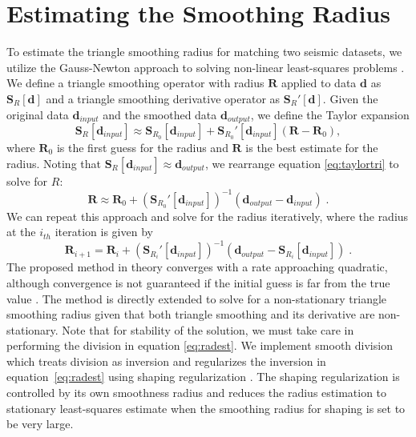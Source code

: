\section{Estimating the Smoothing Radius}
To estimate the triangle smoothing radius for matching two seismic datasets, we utilize the Gauss-Newton approach to solving non-linear least-squares problems \cite[]{lawson1995}. We define a triangle smoothing operator with radius $\mathbf{R}$ applied to data $\mathbf{d}$ as $\mathbf{S}_R[\mathbf{d}]$ and a triangle smoothing derivative operator as $\mathbf{S}_R'[\mathbf{d}]$. 
Given the original data $\mathbf{d}_{input}$ and the smoothed data $\mathbf{d}_{output}$, we define the Taylor expansion
\begin{equation}
\mathbf{S}_R[\mathbf{d}_{input}] \approx \mathbf{S}_{R_0}[\mathbf{d}_{input}] + \mathbf{S}_{R_0}'[\mathbf{d}_{input}](\mathbf{R}-\mathbf{R}_0),
\label{eq:taylortri}
\end{equation}
where $\mathbf{R}_0$ is the first guess for the radius and $\mathbf{R}$ is the best estimate for the radius. Noting that $\mathbf{S}_R[\mathbf{d}_{input}] \approx \mathbf{d}_{output}$, we rearrange equation \ref{eq:taylortri} to solve for $R$:
\begin{equation}
\mathbf{R} \approx \mathbf{R}_0 + \left(\mathbf{S}_{R_0}'[\mathbf{d}_{input}]\right)^{-1}\left(\mathbf{d}_{output} - \mathbf{d}_{input}\right)\;.
\label{eq:rad}
\end{equation}
We can repeat this approach and solve for the radius iteratively, where the radius at the $i_{th}$ iteration is given by
\begin{equation}
\mathbf{R}_{i+1} = \mathbf{R}_i + \left(\mathbf{S}_{R_i}'[\mathbf{d}_{input}]\right)^{-1}\left(\mathbf{d}_{output} - \mathbf{S}_{R_i}[\mathbf{d}_{input}]\right)\;.
\label{eq:radest}
\end{equation}
The proposed method in theory converges with a rate approaching quadratic, although convergence is not guaranteed if the initial guess is far from the true value \cite[]{lawson1995}. The method is directly extended to solve for a non-stationary triangle smoothing radius given that both triangle smoothing and its derivative are non-stationary. Note that for stability of the solution, we must take care in performing the division in equation \ref{eq:radest}. We implement smooth division which treats division as inversion and regularizes the inversion in equation~\ref{eq:radest} using shaping regularization \cite[]{fomel2007b}. 
The shaping regularization is controlled by its own smoothness radius and reduces the radius estimation to stationary least-squares estimate when the smoothing radius for shaping is set to be very large. 
 
